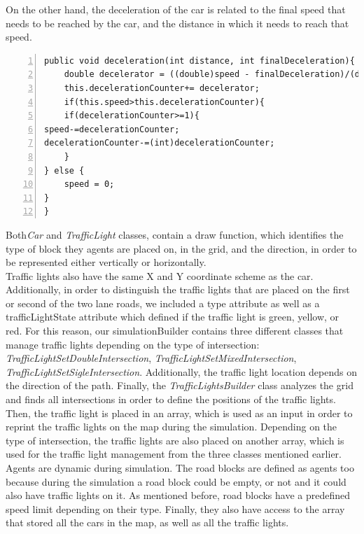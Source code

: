 \documentclass[oneside]{article}
\begin{document}
\noindent On the other hand, the deceleration of the car is related to the final speed that needs to be reached by the car, and the distance in which it needs to reach that speed. 

\begin{lstlisting}[numbers=left, numberstyle=\small, numbersep=8pt,  framexleftmargin=1pt, framexrightmargin=10pt ] 
public void deceleration(int distance, int finalDeceleration){
	double decelerator = ((double)speed - finalDeceleration)/(double)distance;
	this.decelerationCounter+= decelerator;
	if(this.speed>this.decelerationCounter){
	if(decelerationCounter>=1){
speed-=decelerationCounter;
decelerationCounter-=(int)decelerationCounter;
	}
} else {
	speed = 0;
}
}
\end{lstlisting}

\noindent Both\textit{Car} and \textit{TrafficLight} classes, contain a draw function, which identifies the type of block they agents are placed on, in the grid, and the direction, in order to be represented either vertically or horizontally. \\

\noindent Traffic lights also have the same X and Y coordinate scheme as the car. Additionally, in order to distinguish the traffic lights that are placed on the first or second of the two lane roads, we included a type attribute as well as a trafficLightState attribute which defined if the traffic light is green, yellow, or red. For this reason, our simulationBuilder contains three different classes that manage traffic lights depending on the type of intersection: \textit{TrafficLightSetDoubleIntersection}, \textit{TrafficLightSetMixedIntersection}, \textit{TrafficLightSetSigleIntersection}. Additionally, the traffic light location depends on the direction of the path. 
Finally, the \textit{TrafficLightsBuilder} class analyzes the grid and finds all intersections in order to define the positions of the traffic lights. Then, the traffic light is placed in an array, which is used as an input in order to reprint the traffic lights on the map during the simulation. Depending on the type of intersection, the traffic lights are also placed on another array, which is used for the traffic light management from the three classes mentioned earlier. \\

\noindent Agents are dynamic during simulation. The road blocks are defined as agents too because during the simulation a road block could be empty, or not and it could also have traffic lights on it. As mentioned before, road blocks have a predefined speed limit depending on their type. Finally, they also have access to the array that stored all the cars in the map, as well as all the traffic lights. 
\newpage
\end{document}
